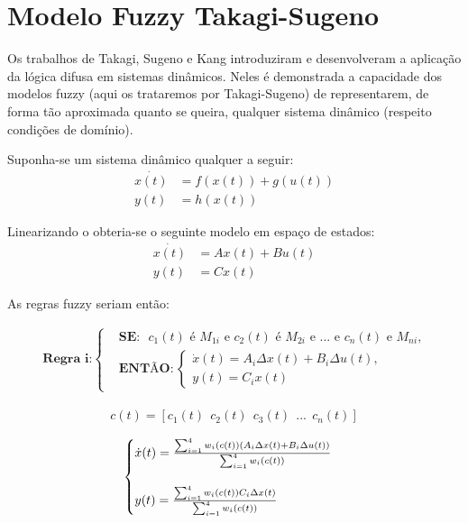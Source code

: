 \section{Modelo Fuzzy Takagi-Sugeno} \label{secTakSug}
Os trabalhos de Takagi, Sugeno \cite{takagiSugeno} e Kang \cite{kang} introduziram e desenvolveram a aplicação da lógica difusa em sistemas dinâmicos. Neles é demonstrada a capacidade dos modelos fuzzy (aqui os trataremos por Takagi-Sugeno) de representarem, de forma tão aproximada quanto se queira, qualquer sistema dinâmico (respeito condições de domínio). 

Suponha-se um sistema dinâmico qualquer a seguir:
\begin{align*}
	\dot{x(t)} &= f(x(t)) + g(u(t)) \\
	y(t) &= h(x(t))
\end{align*}

Linearizando o obteria-se o seguinte modelo em espaço de estados:
\begin{align*}
	\dot{x(t)} &= Ax(t) + Bu(t) \\
	y(t) &= Cx(t)
\end{align*}

As regras fuzzy seriam então:


\begin{align} \label{eqRegraIGeral}
	\textbf{Regra i:}
	\begin{cases}
		&\textbf{SE:} \text{ $c_1(t)$ é $M_{1i}$ e $c_2(t)$ é $M_{2i}$ e ... e $c_n(t)$ e $M_{ni}$,} \\
		&\textbf{ENTÃO}:
		\begin{cases}
			\dot{x}(t) = A_i \Delta x(t) + B_i \Delta u(t),\\
			y(t) = C_ix(t)
		\end{cases}
	\end{cases}
\end{align}

\begin{align}
	c(t) = [c_1(t) \ \ c_2(t) \ \ c_3(t) \ \ ... \ \ c_n(t)]
\end{align}
	
\begin{align} \label{eqModTakSug}
	\begin{cases}
		\dot{x}(t) = \frac{\sum_{i=1}^{4}  w_i(c(t))(A_i \Delta x(t) +  B_i \Delta u(t))}{\sum_{i=1}^{4} w_i(c(t))} \vspace{0.5cm}\\
		y(t) = \frac{\sum_{i=1}^{4}  w_i(c(t)) C_i \Delta x(t)}{\sum_{i=1}^{4} w_i(c(t))}
	\end{cases}
\end{align}

%

